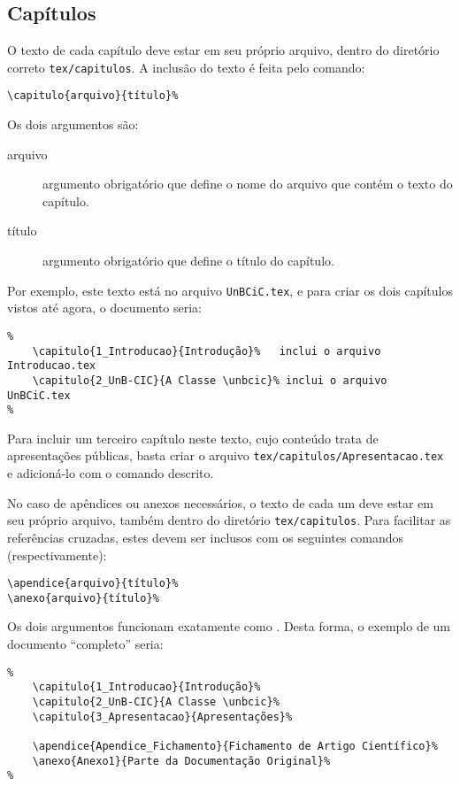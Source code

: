 \subsection{Capítulos}
O texto de cada capítulo deve estar em seu próprio arquivo, dentro do diretório 
correto \texttt{tex/capitulos}. A inclusão do texto é feita pelo comando: 
\begin{verbatim}
\capitulo{arquivo}{título}%
\end{verbatim}

Os dois argumentos são:
\begin{description}%
\item[arquivo] argumento obrigatório que define o nome do arquivo que contém o 
texto do capítulo.
\item[título] argumento obrigatório que define o título do capítulo.
\end{description}%

Por exemplo, este texto está no arquivo \texttt{UnBCiC.tex}, e para criar os 
dois capítulos vistos até agora, o documento seria:

\begin{verbatim}
%
    \capitulo{1_Introducao}{Introdução}%   inclui o arquivo Introducao.tex
    \capitulo{2_UnB-CIC}{A Classe \unbcic}% inclui o arquivo UnBCiC.tex
%
\end{verbatim}

Para incluir um terceiro capítulo neste texto, cujo conteúdo trata de apresentações 
públicas, basta criar o arquivo \texttt{tex/capitulos/Apresentacao.tex} e 
adicioná-lo com o comando descrito.

No caso de apêndices ou anexos necessários, o texto de cada um deve estar em seu 
próprio arquivo, também dentro do diretório \texttt{tex/capitulos}. Para facilitar
as referências cruzadas, estes devem ser inclusos com os seguintes comandos 
(respectivamente):
\begin{verbatim}
\apendice{arquivo}{título}%
\anexo{arquivo}{título}%
\end{verbatim}

Os dois argumentos funcionam exatamente como . Desta forma,
o exemplo de um documento ``completo'' seria: %

\begin{verbatim}
%
    \capitulo{1_Introducao}{Introdução}%
    \capitulo{2_UnB-CIC}{A Classe \unbcic}%
    \capitulo{3_Apresentacao}{Apresentações}%

    \apendice{Apendice_Fichamento}{Fichamento de Artigo Científico}%
    \anexo{Anexo1}{Parte da Documentação Original}%
%
\end{verbatim}

